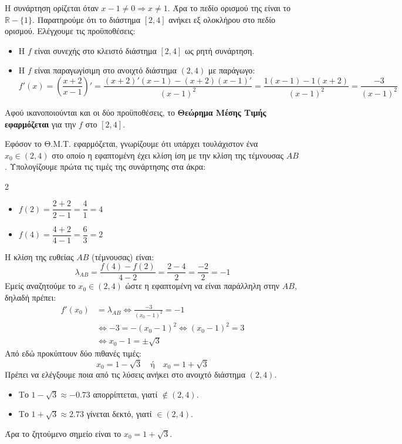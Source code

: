 \lysh
\vspace{-5mm}
\begin{alist}
\item Η συνάρτηση ορίζεται όταν $x-1 \neq 0 \Rightarrow x \neq 1$. Άρα το πεδίο ορισμού της είναι το $\mathbb{R}-\{1\}$. 
Παρατηρούμε ότι το διάστημα $[2,4]$ ανήκει εξ ολοκλήρου στο πεδίο ορισμού. Ελέγχουμε τις προϋποθέσεις:
\begin{itemize}
    \item Η $f$ είναι συνεχής στο κλειστό διάστημα $[2,4]$ ως ρητή συνάρτηση.
    \item Η $f$ είναι παραγωγίσιμη στο ανοιχτό διάστημα $(2,4)$ με παράγωγο:
    \[ f'(x) = \left(\frac{x+2}{x-1}\right)' = \frac{(x+2)'(x-1) - (x+2)(x-1)'}{(x-1)^2} = \frac{1(x-1) - 1(x+2)}{(x-1)^2} = \frac{-3}{(x-1)^2} \]
\end{itemize}
Αφού ικανοποιούνται και οι δύο προϋποθέσεις, το \textbf{Θεώρημα Μέσης Τιμής εφαρμόζεται} για την $f$ στο $[2,4]$.

\item Εφόσον το Θ.Μ.Τ. εφαρμόζεται, γνωρίζουμε ότι υπάρχει τουλάχιστον ένα $x_0 \in (2,4)$ στο οποίο η εφαπτομένη έχει κλίση ίση με την κλίση της τέμνουσας $AB$. 
Υπολογίζουμε πρώτα τις τιμές της συνάρτησης στα άκρα:
\begin{multicols}{2}
\begin{itemize}
    \item $f(2) = \dfrac{2+2}{2-1} = \dfrac{4}{1} = 4$
    \item $f(4) = \dfrac{4+2}{4-1} = \dfrac{6}{3} = 2$
\end{itemize}
\end{multicols}
Η κλίση της ευθείας $AB$ (τέμνουσας) είναι:
\[ \lambda_{AB} = \frac{f(4)-f(2)}{4-2} = \frac{2-4}{2} = \frac{-2}{2} = -1 \]
Εμείς αναζητούμε το $x_0 \in (2,4)$ ώστε η εφαπτομένη να είναι παράλληλη στην $AB$, δηλαδή πρέπει:
\begin{align*}
    f'(x_0) &= \lambda_{AB} \Leftrightarrow
    \frac{-3}{(x_0-1)^2}= -1 \\
    &\Leftrightarrow-3 = -(x_0-1)^2\Leftrightarrow
    (x_0-1)^2= 3 \\
    &\Leftrightarrow x_0-1 = \pm\sqrt{3}
\end{align*}
Από εδώ προκύπτουν δύο πιθανές τιμές:
\[ x_0 = 1 - \sqrt{3} \quad \text{ή} \quad x_0 = 1 + \sqrt{3} \]
Πρέπει να ελέγξουμε ποια από τις λύσεις ανήκει στο ανοιχτό διάστημα $(2,4)$.
\begin{itemize}
    \item Το $1-\sqrt{3} \approx -0.73$ απορρίπτεται, γιατί $\notin (2,4)$.
    \item Το $1+\sqrt{3} \approx 2.73$ γίνεται δεκτό, γιατί $\in (2,4)$.
\end{itemize}
Άρα το ζητούμενο σημείο είναι το $x_0 = 1+\sqrt{3}$.
\end{alist}

